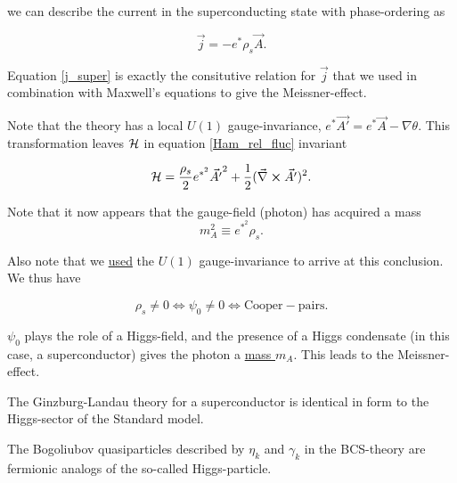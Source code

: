 we can describe the current in the superconducting state with phase-ordering as 

\begin{equation}
\vec{j}  = -e^* \rho_s \vec{A}.
\label{j_super} 
\end{equation}

Equation \eqref{j_super} is exactly the consitutive relation for $\vec{j}$ that we used in combination with Maxwell's equations to give the Meissner-effect.

Note that the theory has a local $U(1)$ gauge-invariance, $e^*\vec{A'} =  e^*\vec{A} - \nabla \theta$. This transformation leaves $\mathcal{H}$ in equation \eqref{Ham_rel_fluc} invariant

\begin{equation}
\mathcal{H} = \frac{\rho_s}{2} e^{*^2} \vec{A'} ^2 + \frac{1}{2}(\vec{\nabla} \cross \vec{A'} )^2.
\label{Ham_rel_fluc_inv} 
\end{equation}

Note that it now appears that the gauge-field (photon) has acquired a mass 
\begin{equation}
m_A^2 \equiv  e^{*^2} \rho_s.
\end{equation}

Also note that we \underline{used} the $U(1)$ gauge-invariance to arrive at this conclusion. We thus have 

\begin{tcolorbox}
\begin{equation*}
\rho_s \neq 0 \iff \psi_0 \neq 0 \iff \mathrm{Cooper-pairs}.
\end{equation*}
\end{tcolorbox}

$\psi_0$ plays the role of a Higgs-field, and the presence of a Higgs condensate (in this case, a superconductor) gives the photon a \underline{mass $m_A$}. This leads to the Meissner-effect. 

The Ginzburg-Landau theory for a superconductor is identical in form to the Higgs-sector of the Standard model. 


\begin{tcolorbox}
The Bogoliubov quasiparticles described by $\eta_k$ and $\gamma_k$ in the BCS-theory are fermionic analogs of the so-called Higgs-particle. 
\end{tcolorbox}


